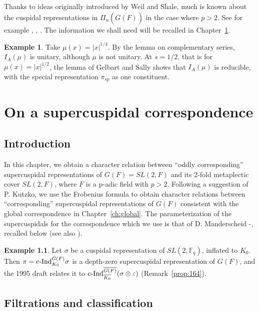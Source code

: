 \documentclass[12pt,letterpaper]{book}
\theoremstyle{plain}
\theoremstyle{definition}
\newtheorem{example}[theorem]{Example}
\theoremstyle{remark}
\theoremstyle{remark}
\begin{document}
Thanks to ideas originally introduced by Weil and Shale, much is known about
the cuspidal representations in $\Pi _u(\overline{G(F)})$ in the case
where $p>2$. See for example \cite{M1}, \cite{M2}, \cite{M3}.
The information we shall need will be recalled in Chapter~\ref{ch:sc}.



\begin{example}
Take $\mu(x)=|x|^{1/4}$. By the lemma on complementary series, $I_A(\mu)$ is
unitary, although $\mu$ is not unitary. At $s=1/2$, that is for
$\mu(x)=|x|^{1/2}$, the lemma of Gelbart and Sally shows that $I_A(\mu)$ is
reducible, with the special representation $\pi_{sp}$ as one constituent.
\end{example}

\chapter{On a supercuspidal correspondence}\label{ch:sc}

\section{Introduction}
In this chapter, we obtain a character relation between
``oddly corresponding'' supercuspidal
representations of $G(F)=SL(2,F)$ and its 2-fold metaplectic cover
$\overline{SL(2,F)}$, where $F$ is a p-adic field with $p>2$.
Following a suggestion of P. Kutzko, we use the Frobenius formula
to obtain character relations between ``corresponding'' supercuspidal
representations of $G(F)$ consistent with the global
correspondence in Chapter~\ref{ch:global}.
The parameterization of the supercuspidals for the correspondence
which we use is that of D. Manderscheid \cite{M1}-\cite{M2}, recalled
below (see also \cite{M3}).

\begin{example}
Let $\sigma$ be a cuspidal representation of $SL(2,{\mathbb F}_q)$, inflated to
$K_0$. Then $\pi={\rm c\text{-}Ind}_{K_0}^{G(F)}\sigma$ is a depth-zero
supercuspidal representation of $G(F)$, and the 1995 draft relates it to
${\rm c\text{-}Ind}_{\overline{K_0}}^{\overline{G(F)}}(\sigma\otimes\varepsilon)$
(Remark~\ref{prop:164}).
\end{example}

\section{Filtrations and classification}\label{sec:filtrations}
\end{document}

